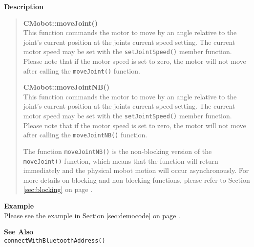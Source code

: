 \noindent
{\bf Description}\\
\vspace{-12pt}
\begin{quote}
{\bf CMobot::moveJoint()}\\
This function commands the motor to move by an angle relative to the
joint's current position at the joints current speed setting.
The current motor speed may be set with the
\texttt{setJointSpeed()} member function. Please note that if the motor speed
is set to zero, the motor will not move after calling the
\texttt{moveJoint()} function. 

{\bf CMobot::moveJointNB()}\\
This function commands the motor to move by an angle relative to the
joint's current position at the joints current speed setting.
The current motor speed may be set with the
\texttt{setJointSpeed()} member function. Please note that if the motor speed
is set to zero, the motor will not move after calling the
\texttt{moveJointNB()} function. 

 The function \texttt{moveJointNB()} is the non-blocking version of
the \texttt{moveJoint()} function, which means that the function will return
immediately and the physical mobot motion will occur asynchronously. For
more details on blocking and non-blocking functions, please refer to 
Section \ref{sec:blocking} on page \pageref{sec:blocking}.\\
\end{quote}

\noindent
{\bf Example}\\
Please see the example in Section \ref{sec:democode} on page \pageref{sec:democode}.\\
\noindent

\noindent
{\bf See Also}\\
\texttt{connectWithBluetoothAddress()}

